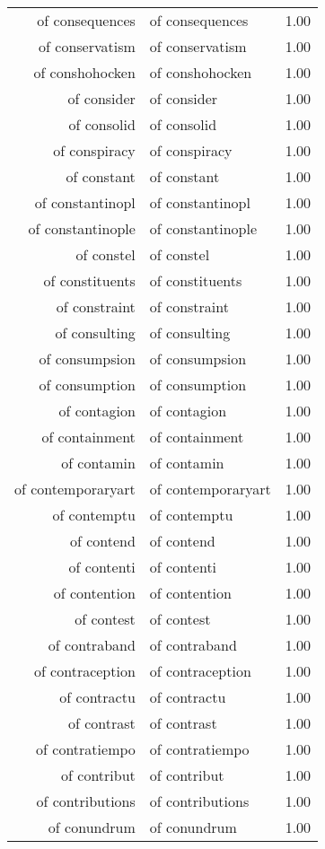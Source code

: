 \begin{table}[ht]
\begin{tabular}{rlr}
  of consequences & of consequences & 1.00 \\ 
  of conservatism & of conservatism & 1.00 \\ 
  of conshohocken & of conshohocken & 1.00 \\ 
  of consider & of consider & 1.00 \\ 
  of consolid & of consolid & 1.00 \\ 
  of conspiracy & of conspiracy & 1.00 \\ 
  of constant & of constant & 1.00 \\ 
  of constantinopl & of constantinopl & 1.00 \\ 
  of constantinople & of constantinople & 1.00 \\ 
  of constel & of constel & 1.00 \\ 
  of constituents & of constituents & 1.00 \\ 
  of constraint & of constraint & 1.00 \\ 
  of consulting & of consulting & 1.00 \\ 
  of consumpsion & of consumpsion & 1.00 \\ 
  of consumption & of consumption & 1.00 \\ 
  of contagion & of contagion & 1.00 \\ 
  of containment & of containment & 1.00 \\ 
  of contamin & of contamin & 1.00 \\ 
  of contemporaryart & of contemporaryart & 1.00 \\ 
  of contemptu & of contemptu & 1.00 \\ 
  of contend & of contend & 1.00 \\ 
  of contenti & of contenti & 1.00 \\ 
  of contention & of contention & 1.00 \\ 
  of contest & of contest & 1.00 \\ 
  of contraband & of contraband & 1.00 \\ 
  of contraception & of contraception & 1.00 \\ 
  of contractu & of contractu & 1.00 \\ 
  of contrast & of contrast & 1.00 \\ 
  of contratiempo & of contratiempo & 1.00 \\ 
  of contribut & of contribut & 1.00 \\ 
  of contributions & of contributions & 1.00 \\ 
  of conundrum & of conundrum & 1.00 \\ 

\end{tabular}
\end{table}
